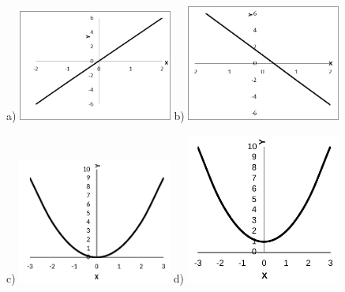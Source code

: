 \begin{respostas}{2}
\begin{figure}[H]
	a) \includegraphics[width=0.45\textwidth]{capitulos/funcao_do_primeiro_grau/media/image26.png} 
	b) \includegraphics[width=0.45\textwidth]{capitulos/funcao_do_primeiro_grau/media/image27.png}
\end{figure}

\begin{figure}[H]
	c) \includegraphics[width=0.45\textwidth]{capitulos/funcao_do_primeiro_grau/media/image28.pdf} 
	d) \includegraphics[width=0.45\textwidth]{capitulos/funcao_do_primeiro_grau/media/image29.pdf}
\end{figure}


\end{respostas}
